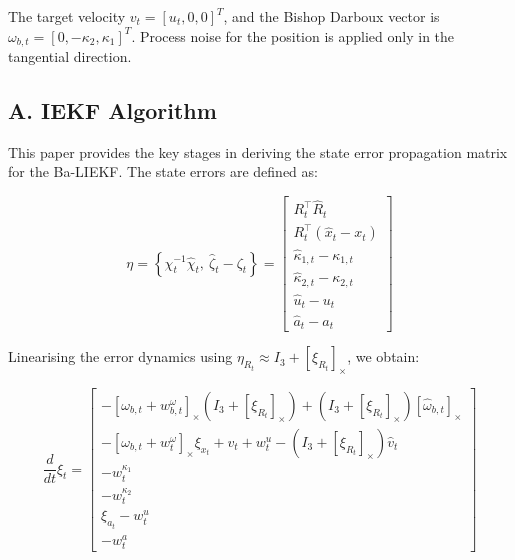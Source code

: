\documentclass[11pt]{article}
\begin{document}
The target velocity $v_t = [u_t, 0, 0]^T$, and the Bishop Darboux vector is $\omega_{b,t} = [0, -\kappa_2, \kappa_1]^T$. Process noise for the position is applied only in the tangential direction.

\subsection*{A. IEKF Algorithm}

This paper provides the key stages in deriving the state error propagation matrix for the Ba-LIEKF. The state errors are defined as:

\begin{equation}
\eta =
\left\{
\chi_t^{-1} \hat{\chi}_t,\ 
\hat{\zeta}_t - \zeta_t
\right\}
=
\begin{bmatrix}
R_t^\top \hat{R}_t \\
R_t^\top(\hat{x}_t - x_t) \\
\hat{\kappa}_{1,t} - \kappa_{1,t} \\
\hat{\kappa}_{2,t} - \kappa_{2,t} \\
\hat{u}_t - u_t \\
\hat{a}_t - a_t
\end{bmatrix}
\label{eq:eta_def}
\end{equation}

Linearising the error dynamics using $\eta_{R_t} \approx I_3 + [\xi_{R_t}]_\times$, we obtain:

\begin{equation}
\frac{d}{dt} \xi_t =
\begin{bmatrix}
-[\omega_{b,t} + w^\omega_{b,t}]_\times (I_3 + [\xi_{R_t}]_\times) + (I_3 + [\xi_{R_t}]_\times)[\hat{\omega}_{b,t}]_\times \\
-[\omega_{b,t} + w^\omega_t]_\times \xi_{x_t} + v_t + w^u_t - (I_3 + [\xi_{R_t}]_\times) \hat{v}_t \\
- w^{\kappa_1}_t \\
- w^{\kappa_2}_t \\
\xi_{a_t} - w^u_t \\
- w^a_t
\end{bmatrix}
\end{equation}
\end{document}
